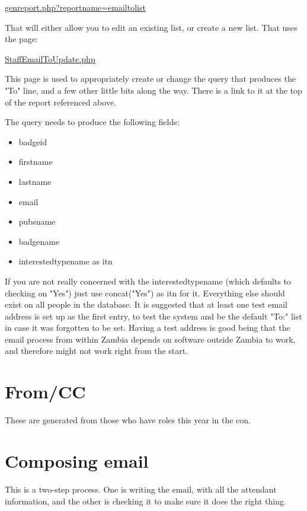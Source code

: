 \documentclass[captions=tablesignature]{scrartcl}
\begin{document}
\label{genreport.php?reportname=emailtolist}
\underline{
\href{../webpages/genreport.php?reportname=emailtolist}{genreport.php?reportname=emailtolist}
}

That will either allow you to edit an existing list, or create a new
list.  That uses the page:

\label{StaffEmailToUpdate.php}
\underline{
\href{../webpages/StaffEmailToUpdate.php}{StaffEmailToUpdate.php}
}

This page is used to appropriately create or change the query that
produces the "To" line, and a few other little bits along the way.
There is a link to it at the top of the report referenced above.

The query needs to produce the following fields:
\begin{itemize}
\item badgeid
\item firstname
\item lastname
\item email
\item pubsname
\item badgename
\item interestedtypename as itn
\end{itemize}

If you are not really concerned with the interestedtypename (which
defaults to checking on "Yes") just use concat("Yes") as itn for it.
Everything else should exist on all people in the database.  It is
suggested that at least one test email address is set up as the
first entry, to test the system and be the default "To:" list in
case it was forgotten to be set.  Having a test address is good
being that the email process from within Zambia depends on software
outside Zambia to work, and therefore might not work right from the
start.

\section{From/CC}
\label{sec-4}

These are generated from those who have roles this year in the con.

\section{Composing email}
\label{sec-5}

This is a two-step process.  One is writing the email, with all the
attendant information, and the other is checking it to make sure it
does the right thing.
\end{document}
